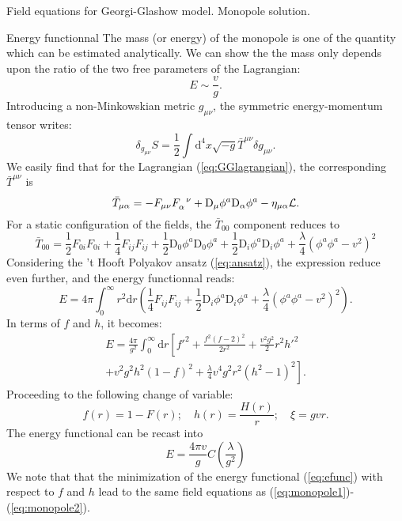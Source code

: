 \begin{section}{Field equations for Georgi-Glashow model. Monopole solution.}
\begin{subsection}{Energy functionnal}
  The mass (or energy) of the monopole is one of the quantity which
  can be estimated analytically. We can show the the mass only depends
  upon the ratio of the two free parameters of the Lagrangian:
  \begin{equation}
    E \sim \frac{v}{g}.
  \end{equation}
  Introducing a non-Minkowskian metric $g_{\mu\nu}$, the symmetric
  energy-momentum tensor writes:
  \begin{equation}
    \delta_{g_{\mu\nu}}S = \frac{1}{2}\int\mathrm{d}^4x\sqrt{-g}\bar T^{\mu\nu}\delta g_{\mu\nu}.
  \end{equation}
  We easily find that for the Lagrangian (\ref{eq:GGlagrangian}), the
  corresponding $\bar T^{\mu\nu}$ is
  \begin{equation}
    \bar T_{\mu\alpha} = -F_{\mu\nu}F_{\alpha}^{\hphantom{\alpha}\nu}+\mathrm{D}_\mu \phi^a \mathrm{D}_\alpha\phi^a-\eta_{\mu\alpha}\mathcal L.
  \end{equation}
  For a static configuration of the fields, the $\bar T_{00}$
  component reduces to
  \begin{equation}
    \bar T_{00} = \frac{1}{2}F_{0i}F_{0i}+\frac{1}{4}F_{ij}F_{ij} +\frac{1}{2}\mathrm{D}_0\phi^a\mathrm{D}_0\phi^a+\frac{1}{2}\mathrm{D}_i\phi^a\mathrm{D}_i\phi^a+\frac{\lambda}{4}\left(\phi^a\phi^a-v^2\right)^2
  \end{equation}
  Considering the 't Hooft Polyakov ansatz (\ref{eq:ansatz}), the
  expression reduce even further, and the energy functionnal reads:
  \begin{equation}
    E = 4\pi\int_0^\infty r^2\mathrm dr\left(\frac{1}{4}F_{ij}F_{ij}+\frac{1}{2}\mathrm{D}_i\phi^a\mathrm{D}_i\phi^a+\frac{\lambda}{4}\left(\phi^a\phi^a-v^2\right)^2\right).\label{eq:staticefunc}
  \end{equation}
  In terms of $f$ and $h$, it becomes:
  \begin{multline}
    E = \frac{4\pi}{g^2}\int_0^\infty \mathrm{d}r \left[f'^2+\frac{f^2(f-2)^2}{2r^2}+\frac{v^2g^2}{2}r^2h'^2\right.\\
      \left.+ v^2g^2h^2(1-f)^2+\frac{\lambda}{4}v^4g^2r^2(h^2-1)^2\right].\label{eq:efunc}
  \end{multline}
  Proceeding to the following change of variable:
  \begin{equation}
    f(r)=1-F(r);\quad h(r)=\frac{H(r)}{r} ;\quad \xi = gvr.
  \end{equation}
  The energy functional can be recast into
  \begin{equation}
    E = \frac{4\pi v}{g} C\left(\frac{\lambda}{g^2}\right)
  \end{equation}
  We note that that the minimization of the energy functional
  (\ref{eq:efunc}) with respect to $f$ and $h$ lead to the same field
  equations as (\ref{eq:monopole1})-(\ref{eq:monopole2}). 
  


\end{subsection}
\end{section}
